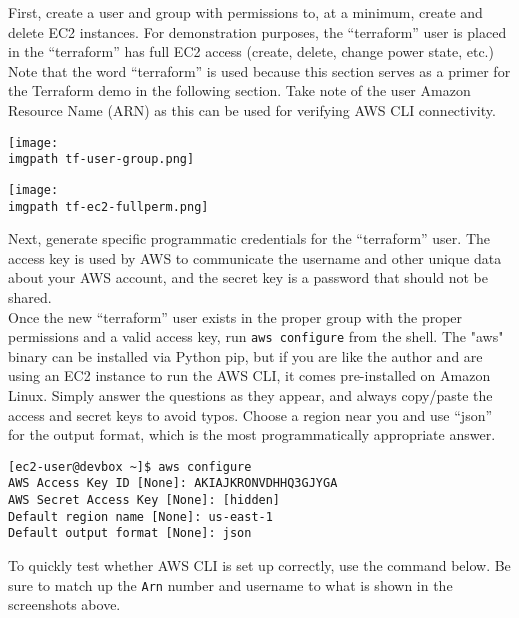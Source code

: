 First, create a user and group with permissions to, at a minimum, create and
delete EC2 instances. For demonstration purposes, the ``terraform'' user is
placed in the ``terraform'' has full EC2 access (create, delete, change power
state, etc.) Note that the word ``terraform'' is used because this section
serves as a primer for the Terraform demo in the following section. Take note
of the user Amazon Resource Name (ARN) as this can be used for verifying AWS
CLI connectivity.

    \begin{minipage}[t]{\linewidth}
	  \centering
      \texttt{[image: \\imgpath tf-user-group.png]}
    \end{minipage}

    \begin{minipage}[t]{\linewidth}
	  \centering
      \texttt{[image: \\imgpath tf-ec2-fullperm.png]}
    \end{minipage}

Next, generate specific programmatic credentials for the ``terraform'' user. The
access key is used by AWS to communicate the username and other unique data
about your AWS account, and the secret key is a password that should not be
shared. \\

Once the new ``terraform'' user exists in the proper group with the proper
permissions and a valid access key, run \verb|aws configure| from the shell. The
"aws" binary can be installed via Python pip, but if you are like the author
and are using an EC2 instance to run the AWS CLI, it comes pre-installed on
Amazon Linux. Simply answer the questions as they appear, and always
copy/paste the access and secret keys to avoid typos. Choose a region near you
and use ``json'' for the output format, which is the most programmatically
appropriate answer.

\begin{verbatim}
[ec2-user@devbox ~]$ aws configure
AWS Access Key ID [None]: AKIAJKRONVDHHQ3GJYGA
AWS Secret Access Key [None]: [hidden]
Default region name [None]: us-east-1
Default output format [None]: json
\end{verbatim}

To quickly test whether AWS CLI is set up correctly, use the command below. Be
sure to match up the \verb|Arn| number and username to what is shown in the
screenshots above.

